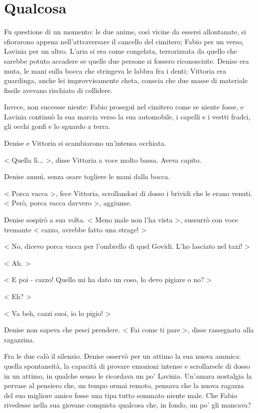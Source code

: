 \chapter{Qualcosa}

Fu questione di un momento: le due anime, così vicine da essersi allontanate, si sfiorarono appena nell'attraversare il cancello del cimitero; Fabio per un verso, Lavinia per un altro. L'aria si era come congelata, terrorizzata da quello che sarebbe potuto accadere se quelle due persone si fossero riconosciute. Denise era muta, le mani sulla bocca che stringeva le labbra fra i denti; Vittoria era guardinga, anche lei improvvisamente cheta, conscia che due masse di materiale fissile avevano rischiato di collidere.

Invece, non successe niente: Fabio proseguì nel cimitero come se niente fosse, e Lavinia continuò la sua marcia verso la sua automobile, i capelli e i vestti fradci, gli occhi gonfi e lo sguardo a terra.

Denise e Vittoria si scambiarono un'intensa occhiata.

< Quella lì... >, disse Vittoria a voce molto bassa. Aveva capito.

Denise annuì, senza osare togliere le mani dalla bocca.

< Porca vacca >, fece Vittoria, scrollandosi di dosso i brividi che le erano venuti. < Però, porca vacca davvero >, aggiunse.

Denise sospirò a sua volta. < Meno male non l'ha vista >, sussurrò con voce tremante < cazzo, avrebbe fatto una strage! >

< No, dicevo porca vacca per l'ombrello di quel Govidi. L'ho lasciato nel taxi! >

< Ah. >

< E poi - cazzo! Quello mi ha dato un coso, lo devo pigiare o no? > 

< Eh? >

< Va beh, cazzi suoi, io lo pigio! >

Denise non sapeva che pesci prendere. < Fai come ti pare >, disse rassegnata alla ragazzina.

Fra le due calò il silenzio. Denise osservò per un attimo la sua nuova ammica: quella spontaneità, la capacità di provare emozioni intense e scrollarsele di dosso in un attimo, in qualche senso le ricordava un po' Lavinia. Un'amara nostalgia la pervase al pensiero che, un tempo ormai remoto, pensava che la nuova ragazza del suo migliore amico fosse una tipa tutto sommato niente male. Che Fabio rivedesse nella sua giovane conquista qualcosa che, in fondo, un po' gli mancava?

